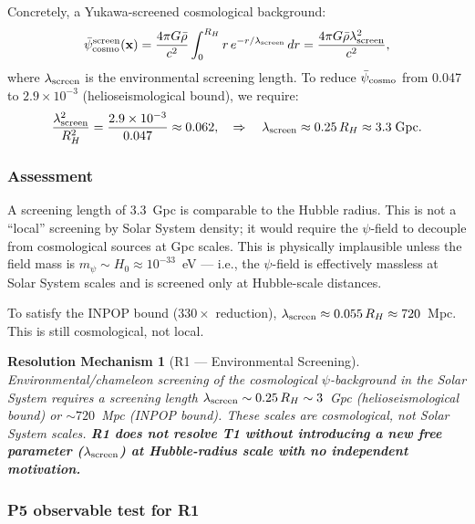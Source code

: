 \documentclass[aps,prd,twocolumn,superscriptaddress,nofootinbib,longbibliography]{revtex4-2}
\newcommand{\psibar}{\bar{\psi}}
\newcommand{\ee}[1]{\times 10^{#1}}
\newtheorem{resolution}{Resolution Mechanism}
\begin{document}
Concretely, a Yukawa-screened cosmological background:
\begin{equation}
\psibar_{\rm cosmo}^{\rm screen}(\mathbf{x}) =
\frac{4\pi G\bar{\rho}}{c^2}\int_0^{R_H}
r\,e^{-r/\lambda_{\rm screen}}\,dr
= \frac{4\pi G\bar{\rho}\lambda_{\rm screen}^2}{c^2},
\label{eq:psibar-screen}
\end{equation}
where $\lambda_{\rm screen}$ is the environmental screening length. To reduce
$\psibar_{\rm cosmo}$ from 0.047 to $2.9\ee{-3}$ (helioseismological bound),
we require:
\begin{equation}
\frac{\lambda_{\rm screen}^2}{R_H^2} = \frac{2.9\ee{-3}}{0.047} \approx 0.062,
\quad\Rightarrow\quad \lambda_{\rm screen} \approx 0.25\,R_H \approx 3.3\;\text{Gpc}.
\label{eq:screening-length}
\end{equation}

\subsubsection{Assessment}

A screening length of 3.3~Gpc is comparable to the Hubble radius.  This
is not a ``local'' screening by Solar System density; it would require the
$\psi$-field to decouple from cosmological sources at Gpc scales. This is
physically implausible unless the field mass is $m_\psi \sim H_0 \approx
10^{-33}$~eV --- i.e., the $\psi$-field is effectively massless at Solar
System scales and is screened only at Hubble-scale distances.

To satisfy the INPOP bound ($330\times$ reduction), $\lambda_{\rm screen}
\approx 0.055\,R_H \approx 720$~Mpc.  This is still cosmological, not local.

\begin{resolution}[R1 --- Environmental Screening]
\label{res:R1}
Environmental/chameleon screening of the cosmological $\psi$-background in
the Solar System requires a screening length $\lambda_{\rm screen} \sim
0.25\,R_H \sim 3$~Gpc (helioseismological bound) or $\sim 720$~Mpc (INPOP
bound).  These scales are cosmological, not Solar System scales.
\textbf{R1 does not resolve T1 without introducing a new free parameter
($\lambda_{\rm screen}$) at Hubble-radius scale with no independent motivation.}
\end{resolution}

\subsubsection{P5 observable test for R1}
\end{document}
